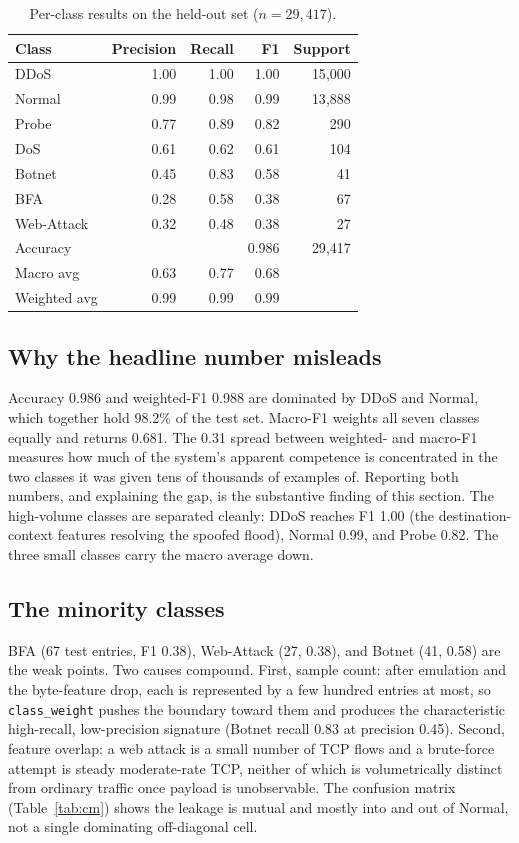 \documentclass[11pt]{article}
\begin{document}
\begin{table}[h]
\centering
\caption{Per-class results on the held-out set ($n = 29{,}417$).}
\label{tab:perclass}
\begin{tabular}{lrrrr}
\toprule
Class & Precision & Recall & F1 & Support \\
\midrule
DDoS & 1.00 & 1.00 & 1.00 & 15{,}000 \\
Normal & 0.99 & 0.98 & 0.99 & 13{,}888 \\
Probe & 0.77 & 0.89 & 0.82 & 290 \\
DoS & 0.61 & 0.62 & 0.61 & 104 \\
Botnet & 0.45 & 0.83 & 0.58 & 41 \\
BFA & 0.28 & 0.58 & 0.38 & 67 \\
Web-Attack & 0.32 & 0.48 & 0.38 & 27 \\
\midrule
Accuracy & & & 0.986 & 29{,}417 \\
Macro avg & 0.63 & 0.77 & 0.68 & \\
Weighted avg & 0.99 & 0.99 & 0.99 & \\
\bottomrule
\end{tabular}
\end{table}

\subsection{Why the headline number misleads}
Accuracy 0.986 and weighted-F1 0.988 are dominated by DDoS and Normal, which together hold
98.2\% of the test set. Macro-F1 weights all seven classes equally and returns 0.681. The
0.31 spread between weighted- and macro-F1 measures how much of the system's apparent
competence is concentrated in the two classes it was given tens of thousands of examples
of. Reporting both numbers, and explaining the gap, is the substantive finding of this
section. The high-volume classes are separated cleanly: DDoS reaches F1 1.00 (the
destination-context features resolving the spoofed flood), Normal 0.99, and Probe 0.82.
The three small classes carry the macro average down.

\subsection{The minority classes}
BFA (67 test entries, F1 0.38), Web-Attack (27, 0.38), and Botnet (41, 0.58) are the weak
points. Two causes compound. First, sample count: after emulation and the byte-feature
drop, each is represented by a few hundred entries at most, so \texttt{class\_weight}
pushes the boundary toward them and produces the characteristic high-recall,
low-precision signature (Botnet recall 0.83 at precision 0.45). Second, feature overlap:
a web attack is a small number of TCP flows and a brute-force attempt is steady
moderate-rate TCP, neither of which is volumetrically distinct from ordinary traffic once
payload is unobservable. The confusion matrix (Table~\ref{tab:cm}) shows the leakage is
mutual and mostly into and out of Normal, not a single dominating off-diagonal cell.
\end{document}
